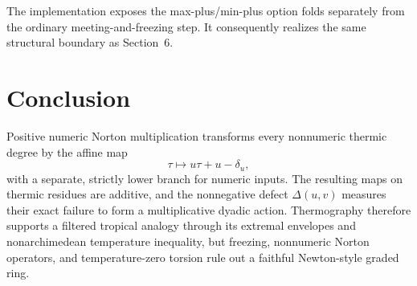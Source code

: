 \documentclass[11pt]{article}
\theoremstyle{definition}
\theoremstyle{remark}
\begin{document}
The implementation exposes the max-plus/min-plus option folds separately
from the ordinary meeting-and-freezing step.  It consequently realizes the
same structural boundary as Section~6.

\section{Conclusion}

Positive numeric Norton multiplication transforms every nonnumeric thermic
degree by the affine map
\[
  \tau\longmapsto u\tau+u-\delta_u,
\]
with a separate, strictly lower branch for numeric inputs.  The resulting
maps on thermic residues are additive, and the nonnegative defect
$\Delta(u,v)$ measures their exact failure to form a multiplicative dyadic
action.  Thermography therefore supports a filtered tropical analogy through
its extremal envelopes and nonarchimedean temperature inequality, but
freezing, nonnumeric Norton operators, and temperature-zero torsion rule out a
faithful Newton-style graded ring.



\end{document}
